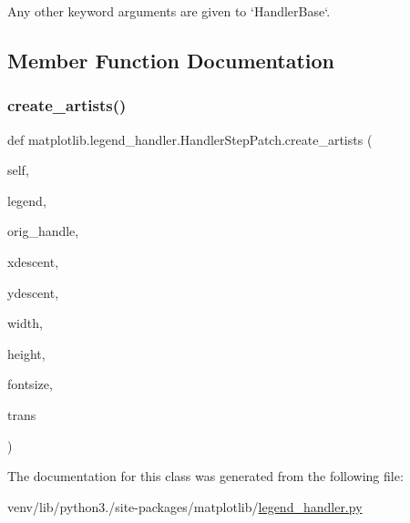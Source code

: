 \begin{DoxyVerb}Any other keyword arguments are given to `HandlerBase`.
\end{DoxyVerb}
 

\subsection{Member Function Documentation}
\mbox{\label{classmatplotlib_1_1legend__handler_1_1HandlerStepPatch_a685e0f0cfc77ba66dc94ccd66ffd2a81}} 
\subsubsection{\texorpdfstring{create\+\_\+artists()}{create\_artists()}}
{\footnotesize\ttfamily def matplotlib.\+legend\+\_\+handler.\+Handler\+Step\+Patch.\+create\+\_\+artists (\begin{DoxyParamCaption}\item[{}]{self,  }\item[{}]{legend,  }\item[{}]{orig\+\_\+handle,  }\item[{}]{xdescent,  }\item[{}]{ydescent,  }\item[{}]{width,  }\item[{}]{height,  }\item[{}]{fontsize,  }\item[{}]{trans }\end{DoxyParamCaption})}



The documentation for this class was generated from the following file\+:\begin{DoxyCompactItemize}
\item 
venv/lib/python3./site-\/packages/matplotlib/\hyperlink{legend__handler_8py}{legend\+\_\+handler.\+py}\end{DoxyCompactItemize}

